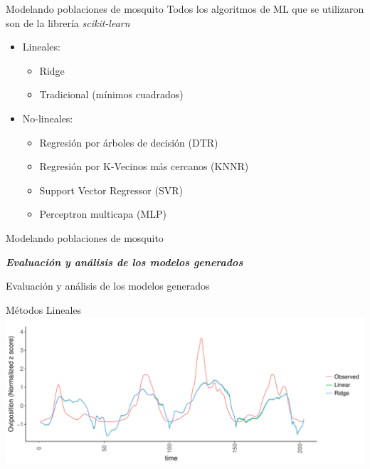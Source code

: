 \documentclass[10pt]{beamer}
\newcommand\IncrFont{\fontsize{20}{20}\selectfont}
\begin{document}
\begin{frame}{Modelando poblaciones de mosquito}
  Todos los algoritmos de ML que se utilizaron son de la librería \textit{scikit-learn}
  \pause
  \begin{itemize}
    \item Lineales:
      \begin{itemize}
        \item Ridge
        \item Tradicional (mínimos cuadrados)
      \end{itemize}
    \item No-lineales:
      \begin{itemize}
        \item Regresión por árboles de decisión (DTR)
        \item Regresión por K-Vecinos más cercanos (KNNR)
        \item Support Vector Regressor (SVR)
        \item Perceptron multicapa (MLP)
      \end{itemize}
  \end{itemize}
\end{frame}



\begin{frame}{Modelando poblaciones de mosquito}
  \IncrFont

  \begin{center}
    \textit{\textbf{Evaluación y análisis de los modelos generados}}
  \end{center}
\end{frame}


\begin{frame}{Evaluación y análisis de los modelos generados}
  \begin{center}
    Métodos Lineales
    \includegraphics[width=1\textwidth]{RidgeVsTime}
  \end{center}
\end{frame}
\end{document}
